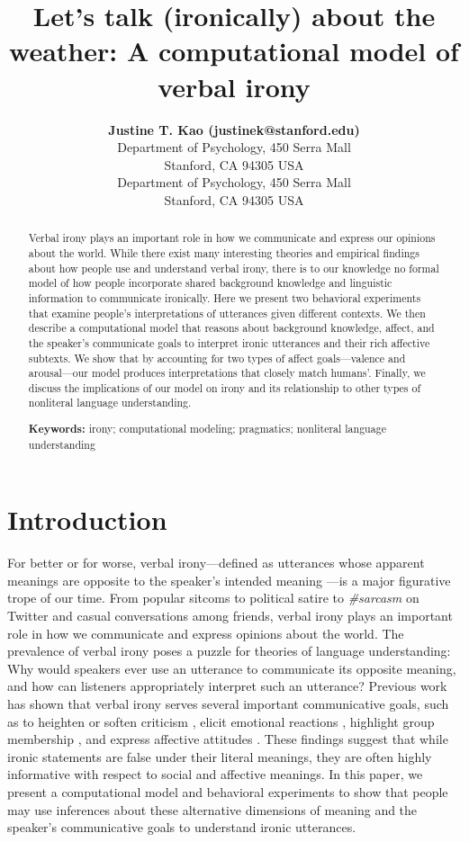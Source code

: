 \documentclass[10pt,letterpaper]{article}
\title{Let's talk (ironically) about the weather: A computational model of verbal irony}
\author{{\large \bf Justine T. Kao
(justinek@stanford.edu)} \\
  Department of Psychology, 450 Serra Mall \\
  Stanford, CA 94305 USA
  \AND {\large \bf Noah D. Goodman (ngoodman@stanford.edu)} \\
  Department of Psychology, 450 Serra Mall \\
  Stanford, CA 94305 USA}
\begin{document}
\maketitle


\begin{abstract}
Verbal irony plays an important role in how we communicate and express our opinions about the world. While there exist many interesting theories and empirical findings about how people use and understand verbal irony, there is to our knowledge no formal model of how people incorporate shared background knowledge and linguistic information to communicate ironically. Here we present two behavioral experiments that examine people's interpretations of utterances given different contexts. We then describe a computational model that reasons about background knowledge, affect, and the speaker's communicate goals to interpret ironic utterances and their rich affective subtexts. We show that by accounting for two types of affect goals---valence and arousal---our model produces interpretations that closely match humans'. Finally, we discuss the implications of our model on irony and its relationship to other types of nonliteral language understanding.


\textbf{Keywords:} 
irony; computational modeling; pragmatics; nonliteral language understanding
\end{abstract}


\section{Introduction}
For better or for worse, verbal irony---defined as utterances whose apparent meanings are opposite to the speaker's intended meaning \cite{roberts1994people, colston2000contrast}---is a major figurative trope of our time. From popular sitcoms to political satire to \emph{\#sarcasm} on Twitter and casual conversations among friends, verbal irony plays an important role in how we communicate and express  opinions about the world. The prevalence of verbal irony poses a puzzle for theories of language understanding: Why would speakers ever use an utterance to communicate its opposite meaning, and how can listeners appropriately interpret such an utterance? Previous work has shown that verbal irony serves several important communicative goals, such as to heighten or soften criticism \cite{colston1997salting}, elicit emotional reactions \cite{leggitt2000emotional}, highlight group membership \cite{gibbs2000irony}, and express affective attitudes \cite{colston1998you, colston1997ve}. These findings suggest that while ironic statements are false under their literal meanings, they are often highly informative with respect to social and affective meanings. 
In this paper, we present a computational model and behavioral experiments to show that people may use inferences about these alternative dimensions of meaning and the speaker's communicative goals to understand ironic utterances.  
\end{document}
